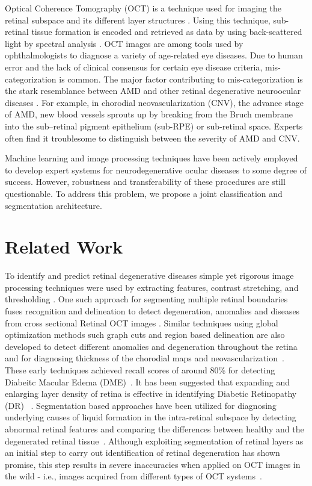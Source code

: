 \documentclass{article}
\begin{document}
Optical Coherence Tomography (OCT) is a technique used for imaging the retinal subspace and its different layer structures \cite{sri2014}. Using this technique, sub-retinal tissue formation is encoded and retrieved as data by using  back-scattered  light  by  spectral analysis \cite{mlSD-OCT2017}. OCT images are among tools used by ophthalmologists to diagnose a variety of age-related eye diseases. Due to human error and the lack of clinical consensus for certain eye disease criteria, mis-categorization is common. The major factor contributing to mis-categorization is the stark resemblance between AMD and other retinal degenerative neuroocular diseases 
\cite{yau2012global}. For example, in chorodial neovascularization (CNV), the advance stage of AMD, new blood vessels sprouts up by breaking from the Bruch membrane into the sub–retinal pigment epithelium (sub-RPE) or sub-retinal space. Experts often find it troublesome to distinguish between the severity of AMD and CNV. 

Machine learning and image processing techniques have been actively employed to develop expert systems for neurodegenerative ocular diseases to some degree of success. However, robustness and transferability of these procedures are still questionable. To address this problem, we propose a joint classification and segmentation architecture. 

\section{Related Work}
To identify and predict retinal degenerative diseases simple yet rigorous image processing techniques were used by extracting features, contrast stretching, and thresholding \cite{baghaie2015state}. One such approach for segmenting multiple retinal boundaries fuses recognition and delineation to detect degeneration, anomalies and diseases from cross sectional Retinal OCT images \cite{debuc2011review}. Similar techniques using global optimization methods such graph cuts and region based delineation are also developed to detect different anomalies and degeneration throughout the retina~\cite{vermeer2011automated} and for diagnosing thickness of the chorodial maps and neovascularization~\cite{alonso2013automatic,philip2016choroidal}. These early techniques achieved recall scores of around 80\% for detecting Diabeitc Macular Edema (DME)~\cite{sanchez2004retinal, ege2000screening}. It has been suggested that expanding and enlarging layer density of retina is effective in identifying Diabetic Retinopathy (DR)~ \cite{mlSD-OCT2017}. Segmentation based approaches have been utilized for diagnosing underlying causes of liquid formation in the intra-retinal subspace by detecting abnormal retinal features and comparing the differences between healthy and the degenerated retinal tissue~\cite{meindertniemeijer2012,quellec2010three,lee2010segmentation}. Although exploiting segmentation of retinal layers as an initial step to carry out identification of retinal degeneration has shown promise, this step results in severe inaccuracies when applied on OCT images in the wild - i.e., images acquired from different types of OCT systems~\cite{kafieh2013review}.
\end{document}
